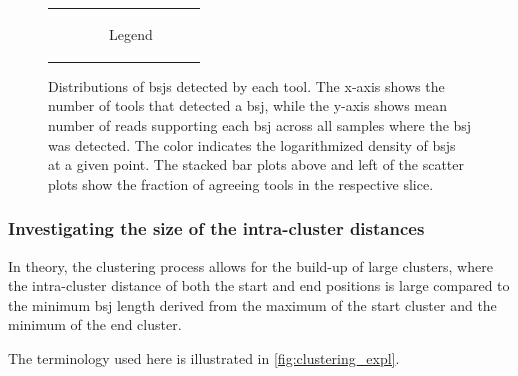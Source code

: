 \begin{figure}[ht]
\begin{tabular}{cc}
                                                                                                                                 & \begin{subfigure}{.4\textwidth}	 \centering \caption{Legend}

                                                                                                                                       \end{subfigure}\end{tabular} \caption{Distributions of \gls{bsj}s detected by
        each tool.
        The x-axis shows the number of tools that detected a \gls{bsj}, while the
        y-axis shows mean number of reads supporting each \gls{bsj} across all samples
        where the \gls{bsj} was detected.
        The color indicates the logarithmized density of \gls{bsj}s at a given point.
        The stacked bar plots above and left of the scatter plots show the fraction of
        agreeing tools in the respective slice.
    }
    \label{fig:detection_density}
\end{figure}

\noindent{}


\subsubsection{Investigating the size of the intra-cluster distances}

In theory, the clustering process allows for the build-up of large clusters,
where the intra-cluster distance of both the start and end positions is large
compared to the minimum \gls{bsj} length derived from the maximum of the start
cluster and the minimum of the end cluster.

The terminology used here is illustrated in \cref{fig:clustering_expl}.

